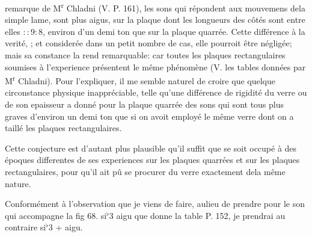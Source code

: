 \documentclass[11pt,a4paper]{article}
\begin{document}

remarque de M\textsuperscript{r} Chladni (V. P. 161), les sons qui répondent aux
mouvemens dela simple lame, sont plus aigus, sur la plaque dont
les longueurs des côtés sont entre elles $::9:8$, environ d'un demi
ton que sur la plaque quarrée. Cette différence  à la verité,
 ;  et considerée dans un petit nombre
de cas, elle pourroit être négligée; mais sa constance la rend
remarquable: car toutes les plaques rectangulaires soumises à
l'experience présentent le même phénomène (V. les tables données
par M\textsuperscript{r} Chladni). Pour l'expliquer, il me semble naturel de
croire que quelque circonstance physique inappréciable, telle
qu'une différence de rigidité  du verre ou de son epaisseur
a donné pour la plaque quarrée des sons qui sont tous plus
graves d'environ un demi ton que si on avoit employé
le même verre dont on a taillé les plaques rectangulaires.

Cette conjecture est d'autant plus plausible qu'il suffit
que  se soit occupé à des époques differentes
de  ses experiences sur les plaques quarrées et sur les
plaques rectangulaires, pour qu'il ait pû se procurer
du verre  exactement dela même
nature.

Conformément à l'observation que je viens de faire,
aulieu de prendre pour le son qui accompagne
la fig 68. si$^{\flat}$3 aigu que donne la table P. 152,
je prendrai au contraire si$^{\flat}$3 + aigu.
\end{document}
